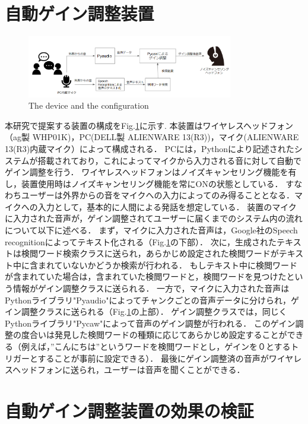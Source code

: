 \documentclass[a4paper]{jarticle}
\begin{document}
\section{自動ゲイン調整装置}
\begin{figure}[htbp]
    \begin{center}
    \includegraphics[width=90mm]{system.PNG}
    \caption{The device and the configuration}
    \label{fig:system}
    \end{center}
    \end{figure}

本研究で提案する装置の構成をFig.\ref{fig:system}に示す.
本装置はワイヤレスヘッドフォン（ag製 WHP01K)，PC(DELL製 ALIENWARE 13(R3))，マイク(ALIENWARE 13(R3)内蔵マイク）によって構成される．
PCには，Pythonにより記述されたシステムが搭載されており，これによってマイクから入力される音に対して自動でゲイン調整を行う．
ワイヤレスヘッドフォンはノイズキャンセリング機能を有し，装置使用時はノイズキャンセリング機能を常にONの状態としている．
すなわちユーザーは外界からの音をマイクへの入力によってのみ得ることとなる．マイクへの入力として，基本的に人間による発話を想定している．
装置のマイクに入力された音声が，ゲイン調整されてユーザーに届くまでのシステム内の流れについて以下に述べる．
まず，マイクに入力された音声は，Google社のSpeech recognitionによってテキスト化される（Fig.\ref{fig:system}の下部）．
次に，生成されたテキストは検閲ワード検索クラスに送られ，あらかじめ設定された検閲ワードがテキスト中に含まれていないかどうか検索が行われる．
もしテキスト中に検閲ワードが含まれていた場合は，含まれていた検閲ワードと，検閲ワードを見つけたという情報がゲイン調整クラスに送られる．
一方で，マイクに入力された音声はPythonライブラリ"Pyaudio"によってチャンクごとの音声データに分けられ，ゲイン調整クラスに送られる（Fig.\ref{fig:system}の上部）．
ゲイン調整クラスでは，同じくPythonライブラリ"Pycaw"によって音声のゲイン調整が行われる．
このゲイン調整の度合いは発見した検閲ワードの種類に応じてあらかじめ設定することができる（例えば，”こんにちは”というワードを検閲ワードとし，ゲインを０とするトリガーとすることが事前に設定できる）．
最後にゲイン調整済の音声がワイヤレスヘッドフォンに送られ，ユーザーは音声を聞くことができる．
\section{自動ゲイン調整装置の効果の検証}
\end{document}
